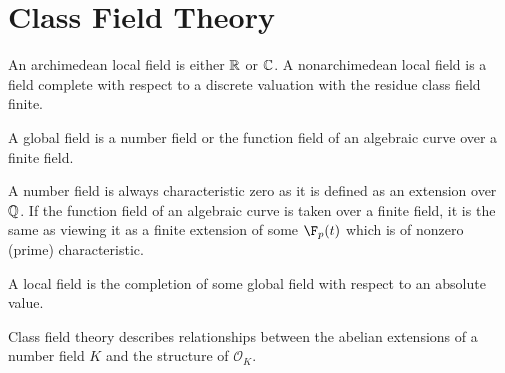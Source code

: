 \setchapterpreamble[u]{\margintoc}
\chapter{Class Field Theory}


\begin{definition}
    An archimedean local field is either $\mathbb{R}$ or $\mathbb{C}$. A nonarchimedean local field is a field complete with respect to a discrete valuation with the residue class field finite.
\end{definition}

\begin{definition}
    A global field is a number field or the function field of an algebraic curve over a finite field.
\end{definition}

A number field is always characteristic zero as it is defined as an extension over $\mathbb{Q}$. If the function field of an algebraic curve is taken over a finite field, it is the same as viewing it as a finite extension of some $\F_p(t)$ which is of nonzero (prime) characteristic.

\begin{proposition}
    A local field is the completion of some global field with respect to an absolute value.
\end{proposition}

Class field theory describes relationships between the abelian extensions of a number field $K$ and the structure of $\mathcal{O}_{K}$.